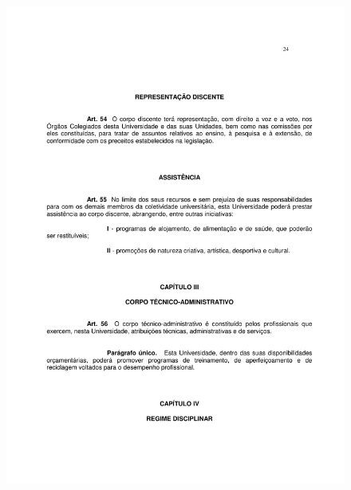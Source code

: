 \begin{figure}[p]
	\centering 
	\includegraphics[scale=0.7]{capitulos/resolucoes/cuni414/cuni414-24.pdf}
\end{figure} \pagebreak

